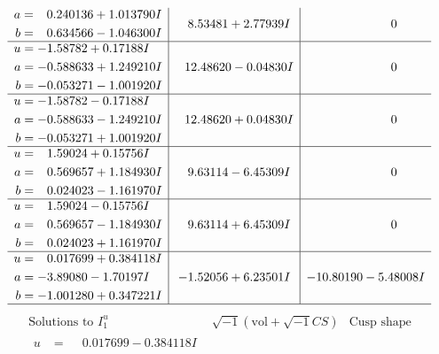 \documentclass[1p]{elsarticle_modified}
\theoremstyle{definition}
\newcommand{\I}{\sqrt{-1}}
\begin{document}
$$\begin{array}{c|c|c}
\begin{aligned}
a &= \phantom{-}0.240136 + 1.013790 I \\
b &= \phantom{-}0.634566 - 1.046300 I\end{aligned}
 & \phantom{-}8.53481 + 2.77939 I & \phantom{-0.000000 } 0 \\ \hline\begin{aligned}
u &= -1.58782 + 0.17188 I \\
a &= -0.588633 + 1.249210 I \\
b &= -0.053271 - 1.001920 I\end{aligned}
 & \phantom{-}12.48620 - 0.04830 I & \phantom{-0.000000 } 0 \\ \hline\begin{aligned}
u &= -1.58782 - 0.17188 I \\
a &= -0.588633 - 1.249210 I \\
b &= -0.053271 + 1.001920 I\end{aligned}
 & \phantom{-}12.48620 + 0.04830 I & \phantom{-0.000000 } 0 \\ \hline\begin{aligned}
u &= \phantom{-}1.59024 + 0.15756 I \\
a &= \phantom{-}0.569657 + 1.184930 I \\
b &= \phantom{-}0.024023 - 1.161970 I\end{aligned}
 & \phantom{-}9.63114 - 6.45309 I & \phantom{-0.000000 } 0 \\ \hline\begin{aligned}
u &= \phantom{-}1.59024 - 0.15756 I \\
a &= \phantom{-}0.569657 - 1.184930 I \\
b &= \phantom{-}0.024023 + 1.161970 I\end{aligned}
 & \phantom{-}9.63114 + 6.45309 I & \phantom{-0.000000 } 0 \\ \hline\begin{aligned}
u &= \phantom{-}0.017699 + 0.384118 I \\
a &= -3.89080 - 1.70197 I \\
b &= -1.001280 + 0.347221 I\end{aligned}
 & -1.52056 + 6.23501 I & -10.80190 - 5.48008 I\\
 \hline 
 \end{array}$$\newpage$$\begin{array}{c|c|c}  
\text{Solutions to }I^u_{1}& \I (\text{vol} + \sqrt{-1}CS) & \text{Cusp shape}\\
 \hline 
\begin{aligned}
u &= \phantom{-}0.017699 - 0.384118 I \\

\end{aligned}
\end{array}$$
\end{document}
